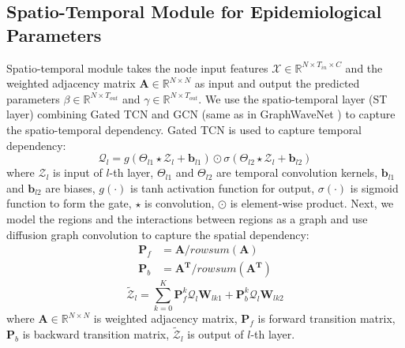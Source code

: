 \documentclass[lettersize,journal]{IEEEtran}
\begin{document}
\subsection{Spatio-Temporal Module for Epidemiological Parameters}
Spatio-temporal module takes the node input features $\mathcal{X}\in \mathbb{R}^{N \times T_{in} \times C}$ and the weighted adjacency matrix $\textbf{A}\in \mathbb{R}^{N \times N}$ as input and output the predicted parameters $\beta \in \mathbb{R}^{N \times T_{out}}$ and $\gamma \in \mathbb{R}^{N \times T_{out}}$. We use the spatio-temporal layer (ST layer) combining Gated TCN and GCN (same as in GraphWaveNet \cite{ref_23}) to capture the spatio-temporal dependency. Gated TCN \cite{ref_24} is used to capture temporal dependency: 
\begin{equation}
    \mathcal{Q}_{l} = g({\Theta_{l1}} \star \mathcal{Z}_{l} + \mathbf{b}_{l1}) \odot  \sigma({\Theta_{l2}} \star \mathcal{Z}_{l} + \mathbf{b}_{l2}) 
\end{equation}
where $\mathcal{Z}_{l}$ is input of $l$-th layer, ${\Theta_{l1}}$ and ${\Theta_{l2}}$ are temporal convolution kernels, $\mathbf{b}_{l1}$ and $\mathbf{b}_{l2}$ are biases, $g(\cdot)$ is tanh activation function for output, $\sigma(\cdot)$ is sigmoid function to form the gate, $\star$ is convolution, $\odot$ is element-wise product. Next, we model the regions and the interactions between regions as a graph and use diffusion graph convolution \cite{ref_22,ref_23} to capture the spatial dependency:
\begin{equation}\label{eq: AtoP}
\begin{aligned}
    \textbf{P}_{f} &= \textbf{A}/rowsum(\textbf{A}) \\
    \textbf{P}_{b} &= \textbf{A}^{\textbf{T}}/rowsum(\textbf{A}^{\textbf{T}}) 
\end{aligned}
\end{equation}
\begin{equation}
        \tilde{\mathcal{Z}}_{l} = \sum_{k=0}^K \textbf{P}^{k}_{f}\mathcal{Q}_{l}\mathbf{W}_{lk1} + \textbf{P}^{k}_{b}\mathcal{Q}_{l}\mathbf{W}_{lk2}
\end{equation}
where $\mathbf{A}\in \mathbb{R}^{N \times N}$ is weighted adjacency matrix, $\textbf{P}_{f}$ is forward transition matrix, $\textbf{P}_{b}$ is backward transition matrix, $\tilde{\mathcal{Z}}_{l}$ is output of $l$-th layer.
\end{document}
